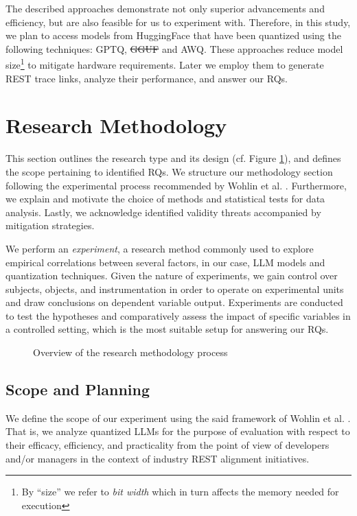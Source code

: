 \documentclass[conference]{IEEEtran}
\begin{document}
The described approaches demonstrate not only superior advancements and efficiency, but are also feasible for us to experiment with. Therefore, in this study, we plan to access models from HuggingFace that have been quantized using the following techniques: GPTQ, \st{GGUF} and AWQ. These approaches reduce model size\footnote{By ``size'' we refer to \textit{bit width} which in turn affects the memory needed for execution} to mitigate hardware requirements. Later we employ them to generate REST trace links, analyze their performance, and answer our RQs. 

\section{Research Methodology}\label{sec:method}


This section outlines the research type and its design (cf. Figure \ref{fig:method-overview}), and defines the scope pertaining to identified RQs. We structure our methodology section following the experimental process recommended by Wohlin et al. \cite{wohlin2012experimentation}. Furthermore, we explain and motivate the choice of methods and statistical tests for data analysis. Lastly, we acknowledge identified validity threats accompanied by mitigation strategies.

We perform an \textit{experiment}, a research method commonly used to explore empirical correlations between several factors, in our case, LLM models and quantization techniques. Given the nature of  experiments, we gain control over subjects, objects, and instrumentation in order to operate on experimental units and draw conclusions on dependent variable output. Experiments are conducted to test the hypotheses and comparatively assess the impact of specific variables in a controlled setting, which is the most suitable setup for answering our RQs.

\begin{figure}[h]
    \centering
    
    \caption{Overview of the research methodology process}
    \label{fig:method-overview}
\end{figure}

\subsection{Scope and Planning}
We define the scope of our experiment using the said framework of Wohlin et al. \cite{wohlin2012experimentation}. That is, we analyze quantized LLMs for the purpose of evaluation with respect to their efficacy, efficiency, and practicality from the point of view of developers and/or managers in the context of industry REST alignment initiatives.
\end{document}

